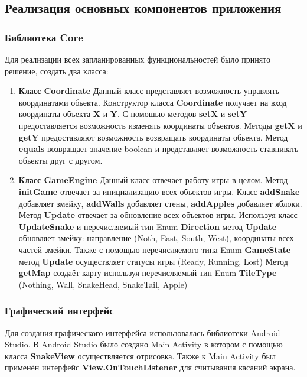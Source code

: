 	\subsection{Реализация основных компонентов приложения}
	
	\subsubsection{Библиотека Core}
	
	Для реализации всех запланированных функциональностей было принято решение, создать два класса:
	
	\begin{enumerate}
		
		\item \textbf{Класс Coordinate}
		Данный класс представляет возможность управлять координатами обьекта. Конструктор класса \textbf{Coordinate} получает на вход координаты объекта \textbf{X} и \textbf{Y}. С помошью методов \textbf{setX} и \textbf{setY} предоставляется возможность изменять координаты объектов. Методы \textbf{getX} и \textbf{getY} предоставляют возможность возвращать координаты обьекта. Метод \textbf{equals} возвращает значение boolean и представляет возможность ставнивать обьекты друг с другом.
		
		\item \textbf{Класс GameEngine}
		Данный класс отвечает работу игры в целом. 
		Метод \textbf{initGame} отвечает за инициализацию всех объектов игры. Класс \textbf{addSnake} добавляет змейку, \textbf{addWalls}  добавляет стены, \textbf{addApples} добавляет яблоки.
		Метод \textbf{Update} отвечает за обновление всех объектов игры. Используя класс \textbf{UpdateSnake} и перечисляемый тип Enum \textbf{Direction} метод \textbf{Update} обновляет змейку: направление (Noth, East, South, West), координаты всех частей змейки. Также с помощью перечисляемого типа Enum \textbf{GameState} метод \textbf{Update} осуществляет статусы игры (Ready, Running, Lost)
		Метод \textbf{getMap} создаёт карту используя перечисляемый тип Enum \textbf{TileType} (Nothing, Wall, SnakeHead, SnakeTail, Apple)
		
	\end{enumerate}
	
	\subsubsection{Графический интерфейс}
	
		Для создания графического интерфейса использовалась библиотеки Android Studio. 
		В Android Studio было создано Main Activity в котором с помощью класса \textbf{SnakeView} осуществляется отрисовка. Также к Main Activity был применён интерфейс \textbf{View.OnTouchListener} для считывания касаний экрана.
		
